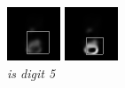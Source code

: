 \documentclass{article} %
\begin{document}
\begin{figure}[t]
\label{fig1}
\captionsetup{labelformat=empty}
  \includegraphics[width=\linewidth]{figures/5-7-4.png}
  \caption{\textit{is digit 5}}
\endminipage\hfill
{}
  \includegraphics[width=\linewidth]{figures/5-7-6.png}

\end{figure}
\end{document}
